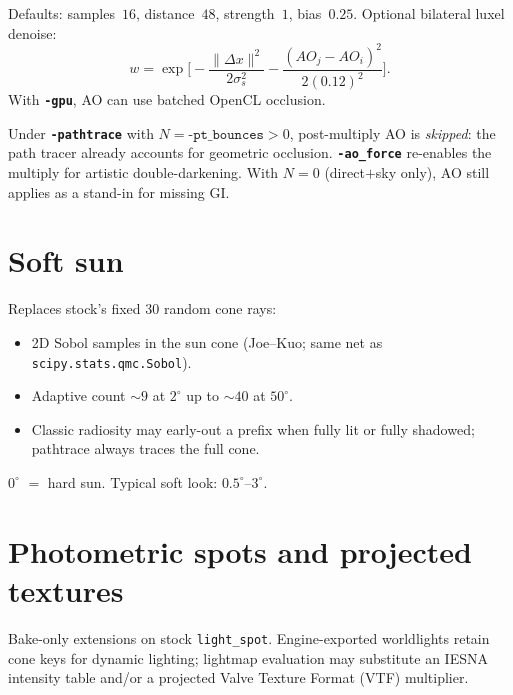 \documentclass[11pt,a4paper]{article}
\newcommand{\flag}[1]{\texttt{\bfseries #1}}
\newcommand{\ent}[1]{\texttt{#1}}
\begin{document}
Defaults: samples~$16$, distance~$48$, strength~$1$, bias~$0.25$.
Optional bilateral luxel denoise:
\begin{equation}
  w
  =
  \exp\!\Biggl[
    -\frac{\|\Delta x\|^{2}}{2\sigma_s^{2}}
    -\frac{(AO_j-AO_i)^{2}}{2(0.12)^{2}}
  \Biggr].
\end{equation}
With \flag{-gpu}, AO can use batched OpenCL occlusion.

\begin{warnbox}
  Under \flag{-pathtrace} with $N=\texttt{-pt\_bounces}>0$, post-multiply AO is
  \emph{skipped}: the path tracer already accounts for geometric occlusion.
  \flag{-ao\_force} re-enables the multiply for artistic double-darkening.
  With $N=0$ (direct$+$sky only), AO still applies as a stand-in for missing GI.
\end{warnbox}

\section{Soft sun}
\label{sec:softsun}

Replaces stock's fixed $30$ random cone rays:

\begin{itemize}[leftmargin=1.4em]
  \item 2D Sobol samples in the sun cone (Joe--Kuo; same net as \texttt{scipy.stats.qmc.Sobol}).
  \item Adaptive count $\sim\!9$ at $2^\circ$ up to $\sim\!40$ at $50^\circ$.
  \item Classic radiosity may early-out a prefix when fully lit or fully shadowed;
        pathtrace always traces the full cone.
\end{itemize}
$0^\circ$ $=$ hard sun. Typical soft look: $0.5^\circ$--$3^\circ$.

\section{Photometric spots and projected textures}
\label{sec:photometric}

Bake-only extensions on stock \ent{light\_spot}. Engine-exported worldlights
retain cone keys for dynamic lighting; lightmap evaluation may substitute an
IESNA intensity table and/or a projected Valve Texture Format (VTF) multiplier.
\end{document}
